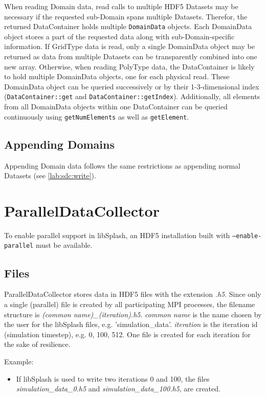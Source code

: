 \documentclass[a4paper,10pt,BCOR12mm]{report}
\newcommand{\code}[1]{\small \texttt{#1}}
\begin{document}
When reading Domain data, read calls to multiple HDF5 Datasets may be necessary if the requested
sub-Domain spans multiple Datasets. Therefor, the returned DataContainer holds multiple
\code{DomainData} objects.
Each DomainData object stores a part of the requested data along with sub-Domain-specific information.
If GridType data is read, only a single DomainData object may be returned as data from multiple Datasets can
be transparently combined into one new array.
Otherwise, when reading PolyType data, the DataContainer is likely to hold multiple DomainData objects, one for
each physical read.
These DomainData object can be queried successively or by their 1-3-dimensional index
(\code{DataContainer::get} and \code{DataContainer::getIndex}).
Additionally, all elements from all DomainData objects within one DataContainer can be
queried continuously using \code{getNumElements} as well as
\code{getElement}.


\section{Appending Domains}

Appending Domain data follows the same restrictions as appending normal Datasets (see \ref{lab:sdc:write}).



\chapter{ParallelDataCollector}

To enable parallel support in libSplash, an HDF5 installation built with \code{--enable-parallel}
must be available.


\section{Files}

ParallelDataCollector stores data in HDF5 files with the extension \emph{.h5}.
Since only a single (parallel) file is created by all participating MPI processes,
the filename structure is \emph{(common name)\_(iteration).h5}.
\emph{common name} is the name chosen by the user for the libSplash files, e.g.
'simulation\_data'.
\emph{iteration} is the iteration id (simulation timestep), e.g. 0, 100, 512.
One file is created for each iteration for the sake of resilience.

Example:
\begin{itemize}
	\item If libSplash is used to write two iterations 0 and 100, the files
	\emph{simulation\_data\_0.h5} and \emph{simulation\_data\_100.h5}, are created.
\end{itemize}
\end{document}
